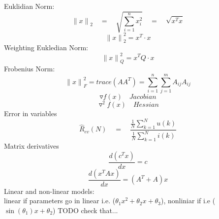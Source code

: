 
\begin{tcolorbox}[colback=blue!5!white,colframe=blue!75!black,title=Introduction]
Euklidian Norm: 
\begin{equation*}
{ \parallel x\parallel  }_{ 2 }\quad =\quad \sqrt { \sum _{ i=1 }^{ n }{ { x }_{ i }^{ 2 } }  } \quad =\quad \sqrt { { x }^{ T }x }
\end{equation*}
\begin{equation*}
{\parallel x\parallel  }_{ 2 }^{ 2 } = x^T\cdot x
\end{equation*}
Weighting Eukledian Norm:
\begin{equation*}
{\parallel x\parallel  }_{ Q }^{ 2 } = x^TQ \cdot x
\end{equation*}
Frobenius Norm:
\begin{equation*}
{\parallel x\parallel  }_{ F }^{ 2 } = trace(A{ A }^{ T })=\sum _{ i=1 }^{ n } \sum _{ j=1 }^{ m }{ { A }_{ ij }{ A }_{ ij } } 
\end{equation*}
\begin{equation*}
\triangledown f(x) \quad Jacobian
\end{equation*}
\begin{equation*}
{ \triangledown  }^{ 2 }f(x)\quad Hessian
\end{equation*}
\tcblower
Error in variables
\begin{equation*}
\hat { R } _{ ev }(N)\quad =\quad \frac { \frac { 1 }{ N } \sum _{ k=1 }^{ N }{ u(k) }  }{ \frac { 1 }{ N } \sum _{ k=1 }^{ N }{ i(k) }  }
\end{equation*}
Matrix derivatives
\begin{equation*}
\frac{d(c^Tx)}{dx} = c
\end{equation*} 
\begin{equation*}
\frac{d(x^TAx)}{dx} = (A^T + A)x
\end{equation*} 
Linear and non-linear models:\\
linear if parameters go in linear i.e. ($\theta_1 x^2 + \theta_2 x + \theta_3$), nonliniar if i.e ($\sin(\theta_1)x + \theta_2$) TODO check that...


\end{tcolorbox}
